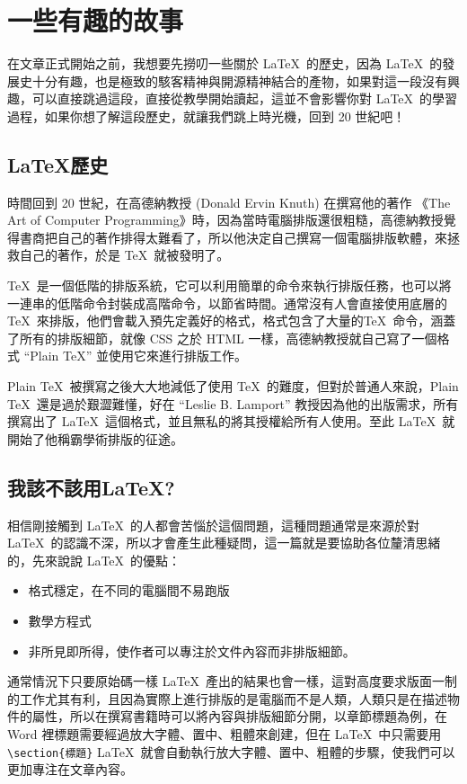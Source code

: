 \chapter{一些有趣的故事}

在文章正式開始之前，我想要先撈叨一些關於 \LaTeX\ 的歷史，因為 \LaTeX\ 的發展史十分有趣，也是極致的駭客精神與開源精神結合的產物，如果對這一段沒有興趣，可以直接跳過這段，直接從教學開始讀起，這並不會影響你對 \LaTeX\ 的學習過程，如果你想了解這段歷史，就讓我們跳上時光機，回到 20 世紀吧！

\section{\LaTeX 歷史}

時間回到 20 世紀，在高德納教授 (Donald Ervin Knuth) 在撰寫他的著作 《The Art of Computer Programming》時，因為當時電腦排版還很粗糙，高德納教授覺得書商把自己的著作排得太難看了，所以他決定自己撰寫一個電腦排版軟體，來拯救自己的著作，於是 \TeX\ 就被發明了。

\TeX\ 是一個低階的排版系統，它可以利用簡單的命令來執行排版任務，也可以將一連串的低階命令封裝成高階命令，以節省時間。通常沒有人會直接使用底層的 \TeX\ 來排版，他們會載入預先定義好的格式，格式包含了大量的\TeX\ 命令，涵蓋了所有的排版細節，就像 CSS 之於 HTML 一樣，高德納教授就自己寫了一個格式 ``Plain \TeX '' 並使用它來進行排版工作。

Plain \TeX\ 被撰寫之後大大地減低了使用 \TeX\ 的難度，但對於普通人來說，Plain \TeX\ 還是過於艱澀難懂，好在 ``Leslie B. Lamport'' 教授因為他的出版需求，所有撰寫出了 \LaTeX\ 這個格式，並且無私的將其授權給所有人使用。至此 \LaTeX\ 就開始了他稱霸學術排版的征途。

\section{我該不該用\LaTeX ?}

相信剛接觸到 \LaTeX\ 的人都會苦惱於這個問題，這種問題通常是來源於對 \LaTeX\ 的認識不深，所以才會產生此種疑問，這一篇就是要協助各位釐清思緒的，先來說說 \LaTeX\ 的優點：

\begin{itemize}
\item 格式穩定，在不同的電腦間不易跑版
\item 數學方程式
\item 非所見即所得，使作者可以專注於文件內容而非排版細節。
\end{itemize}
\pskip
通常情況下只要原始碼一樣 \LaTeX\ 產出的結果也會一樣，這對高度要求版面一制的工作尤其有利，且因為實際上進行排版的是電腦而不是人類，人類只是在描述物件的屬性，所以在撰寫書籍時可以將內容與排版細節分開，以章節標題為例，在 Word 裡標題需要經過放大字體、置中、粗體來創建，但在 \LaTeX\ 中只需要用 \verb|\section{標題}|  \LaTeX\ 就會自動執行放大字體、置中、粗體的步驟，使我們可以更加專注在文章內容。

